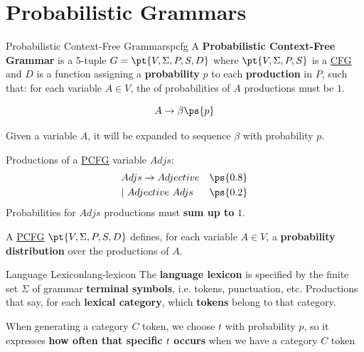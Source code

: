 \section{Probabilistic Grammars}\label{sec:lm_probabilistic_grammars} %
\begin{definition}{Probabilistic Context-Free Grammars}{pcfg}
    A \textbf{Probabilistic Context-Free Grammar} is a 5-tuple $G = \pt{V,\Sigma,P,S,D}$ where $\pt{V,\Sigma,P,S}$ is a \hyperref[def:cfg]{CFG} and $D$ is a function assigning a \textbf{probability} $p$ to each \textbf{production} in $P$, such that: for each variable $A \in V$, the  of probabilities of $A$ productions must be $1$.
    \begin{note}[Notation]
        \[
            A\to\beta \ps{p}
        \]
        \begin{tip}
            Given a variable $A$, it will be expanded to sequence $\beta$ with probability $p$.
        \end{tip}
    \end{note}
\end{definition}
\begin{example}{}{}
    Productions of a \hyperref[def:pcfg]{PCFG} variable $Adjs$:
    \[
        \begin{aligned}
            &Adjs \to Adjective &\ps{0.8} \\
            &|\ Adjective\ Adjs & \ps{0.2}
        \end{aligned}
    \]
    Probabilities for $Adjs$ productions must \textbf{sum up to} $1$.
\end{example}
\begin{remark}{}{}
    A \hyperref[def:pcfg]{PCFG} $\pt{V,\Sigma,P,S,D}$ defines, for each variable $A \in V$, a \textbf{probability distribution} over the productions of $A$.
\end{remark}
\begin{definition}{Language Lexicon}{lang-lexicon}
    The \textbf{language lexicon} is specified by the finite set $\Sigma$ of grammar \textbf{terminal symbols}, i.e. tokens, punctuation, etc.
    Productions that say, for each \textbf{lexical category}, which \textbf{tokens} belong to that category.
    \begin{note}
        When generating a category $C$ token, we choose $t$ with probability $p$, so it expresses \textbf{how often that specific $t$ occurs} when we have a category $C$ token 
    \end{note}
\end{definition}
%
